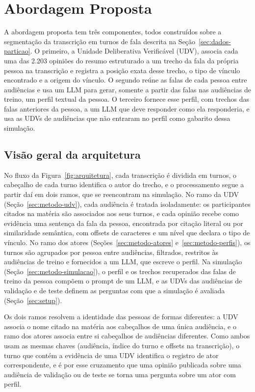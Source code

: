 \section{Abordagem Proposta}
\label{sec:metodo}

A abordagem proposta tem três componentes, todos construídos sobre a segmentação da transcrição em
turnos de fala descrita na Seção~\ref{sec:dados-particao}. O primeiro, a Unidade Deliberativa
Verificável (UDV), associa cada uma das 2.203 opiniões do resumo estruturado a um trecho da fala da
própria pessoa na transcrição e registra a posição exata desse trecho, o tipo de vínculo encontrado e
a origem do vínculo. O segundo reúne as falas de cada pessoa entre audiências e usa um LLM para
gerar, somente a partir das falas nas audiências de treino, um perfil textual da pessoa. O
terceiro fornece esse perfil, com trechos das falas anteriores da pessoa, a um LLM que deve
responder como ela responderia, e usa as UDVs de audiências que não entraram no perfil como gabarito
dessa simulação.

\subsection{Visão geral da arquitetura}
\label{sec:metodo-visao}



No fluxo da Figura~\ref{fig:arquitetura}, cada transcrição é dividida em turnos, o cabeçalho
de cada turno identifica o autor do trecho, e o processamento segue a partir daí em dois ramos, que
se reencontram na simulação. No ramo da UDV (Seção~\ref{sec:metodo-udv}), cada audiência é tratada
isoladamente: os participantes citados na matéria são associados aos seus turnos, e cada opinião
recebe como evidência uma sentença da fala da pessoa, encontrada por citação literal ou por
similaridade semântica, com offsets de caracteres e um nível que declara o tipo de vínculo. No ramo
dos atores (Seções~\ref{sec:metodo-atores} e~\ref{sec:metodo-perfis}), os turnos são agrupados por
pessoa entre audiências, filtrados, restritos às audiências de treino e fornecidos a um LLM, que
escreve o perfil. Na simulação (Seção~\ref{sec:metodo-simulacao}), o perfil e os trechos
recuperados das falas de treino da pessoa compõem o prompt de um LLM, e as UDVs das audiências de
validação e de teste definem as perguntas com que a simulação é avaliada (Seção~\ref{sec:setup}).

Os dois ramos resolvem a identidade das pessoas de formas diferentes: a UDV associa o nome citado na
matéria aos cabeçalhos de uma única audiência, e o ramo dos atores associa entre si cabeçalhos de
audiências diferentes. Como ambos usam as mesmas chaves (audiência, índice do turno e offsets na
transcrição), o turno que contém a evidência de uma UDV identifica o registro de ator
correspondente, e é por esse cruzamento que uma opinião publicada sobre uma audiência de validação
ou de teste se torna uma pergunta sobre um ator com perfil.

